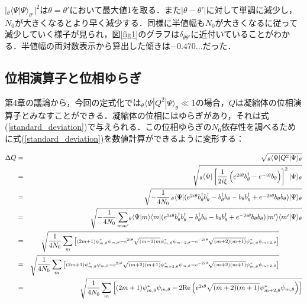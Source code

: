 \documentclass[10.5pt,a4paper]{jreport}
\begin{document}
$|_\theta\langle\Psi|\Psi\rangle_{\theta '}|^2$は$\theta=\theta'$において最大値1を取る．また$|\theta-\theta'|$に対して単調に減少し，
$N_0$が大きくなるとより早く減少する．同様に半値幅も$N_0$が大きくなるに従って減少していく様子が見られ，図\ref{fig1}のグラフは$\delta_{\theta\theta'}$に近付いていることがわかる．半値幅の両対数表示から算出した傾きは$-0.470...$だった．

\newpage
\subsection{位相演算子と位相ゆらぎ}
第4章の議論から，今回の定式化では$_\theta\langle\Psi|Q^2|\Psi\rangle_\theta \ll 1$の場合，$Q$は凝縮体の位相演算子とみなすことができる．凝縮体の位相にはゆらぎがあり，それは式(\ref{standard_deviation})で与えられる．この位相ゆらぎの$N_0$依存性を調べるために式(\ref{standard_deviation})を数値計算ができるように変形する：

\begin{eqnarray}
  \Delta Q &=& \sqrt{_\theta\langle\Psi|Q^2|\Psi\rangle_\theta}\\
  &=&\sqrt{_\theta\langle\Psi|\left[\frac{1}{2i\xi}\left(e^{2i\theta}b_\theta^\dagger - e^{-i\theta}b_\theta \right)\right]^2|\Psi\rangle_\theta}\\
  &=&\sqrt{-\frac{1}{4N_0}\  \!_\theta\langle\Psi|(e^{2i\theta}b_\theta^\dagger b_\theta^\dagger - b_\theta^\dagger b_\theta -b_\theta b_\theta^\dagger + e^{-2i\theta}b_\theta b_\theta)|\Psi\rangle_\theta}\\
  &=&\sqrt{-\frac{1}{4N_0}\sum_{mm'} \!_\theta\langle\Psi|m\rangle\langle m|(e^{2i\theta}b_\theta^\dagger b_\theta^\dagger - b_\theta^\dagger b_\theta -b_\theta b_\theta^\dagger + e^{-2i\theta}b_\theta b_\theta)|m'\rangle\langle m'|\Psi\rangle_\theta}\\
  &=&\sqrt{\frac{1}{4N_0}\sum_{m}{\scriptstyle \left[(2m+1)\psi^*_{m,\theta}\psi_{m,\theta}-e^{2i\theta}\sqrt{(m-1)m}\psi^*_{m,\theta}\psi_{m-2,\theta}-e^{-2i\theta}\sqrt{(m+2)(m+1)}\psi^*_{m,\theta}\psi_{m+2,\theta}\right]}}\ \ \ \ \ \ \ \ \ \ \\
  &=&\sqrt{\frac{1}{4N_0}\sum_{m}{\scriptstyle \left[(2m+1)\psi^*_{m,\theta}\psi_{m,\theta}-e^{2i\theta}\sqrt{(m+2)(m+1)}\psi^*_{m+2,\theta}\psi_{m,\theta}-e^{-2i\theta}\sqrt{(m+2)(m+1)}\psi^*_{m,\theta}\psi_{m+2,\theta}\right]}}\ \ \ \ \ \ \ \ \ \ \\
  &=&\sqrt{\frac{1}{4N_0}\sum_m\left[(2m+1)\psi^*_{m,\theta}\psi_{m,\theta}-2{\rm Re}\left( e^{2i\theta}\sqrt{(m+2)(m+1)}\psi^*_{m+2,\theta}\psi_{m,\theta}\right)\right]}
\end{eqnarray}
\end{document}
